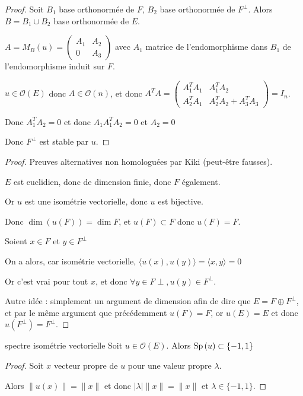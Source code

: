 \begin{proof}
    Soit $B_1$ base orthonormée de $F$, $B_2$ base orthonormée de $F^\perp$.
    Alors $B = B_1 \cup B_2$ base orthonormée de $E$.

    $A = M_B(u) = \begin{pmatrix}
        A_1 & A_2 \\
        0 & A_3
        \end{pmatrix}$ avec $A_1$ matrice de l'endomorphisme dans $B_1$
        de l'endomorphisme induit sur $F$. 

    $u \in \mathcal O(E)$ donc $A \in \mathcal O(n)$, et donc 
    $A^T A = \begin{pmatrix}
        A_1^T A_1 & A_1^T A_2 \\
        A_2^T A_1 & A_2^T A_2 + A_3^T A_3
    \end{pmatrix} = I_n$.

    Donc $A_1^T A_2 = 0$ et donc $A_1 A_1^T A_2 = 0$ et $A_2 = 0$ 

    Donc $F^\perp$ est stable par $u$.
\end{proof}

\begin{proof}
    Preuves alternatives non homologuées par Kiki (peut-être fausses). 

    $E$ est euclidien, donc de dimension finie, donc $F$ également. 

    Or $u$ est une isométrie vectorielle, donc $u$ est bijective. 

    Donc $\dim (u(F)) = \dim F$, et $u(F) \subset F$ donc $u(F) = F$. 

    Soient $x \in F$ et $y \in F^\perp$

    On a alors, car isométrie vectorielle, $\langle u(x), u(y) \rangle = \langle x, y \rangle = 0$

    Or c'est vrai pour tout $x$, et donc $\forall y \in F\perp, u(y) \in F^\perp$. 

    \lvspace Autre idée : simplement un argument de dimension afin de dire que $E = F \oplus F^\perp$, 
    et par le même argument que précédemment $u(F) = F$, or $u(E) = E$ et donc $u(F^\perp) = F^\perp$. 
\end{proof}

\begin{proposition}{spectre isométrie vectorielle}{}
    Soit $u \in \mathcal O(E)$. Alors $\operatorname{Sp} \, (u) \subset \{ -1, 1 \}$
\end{proposition}

\begin{proof}
    Soit $x$ vecteur propre de $u$ pour une valeur propre $\lambda$. 

    Alors $\| u(x) \|  = \| x \|$ et donc $|\lambda| \| x \| = \| x \|$ et $\lambda \in \{ -1, 1 \}$.
\end{proof}


